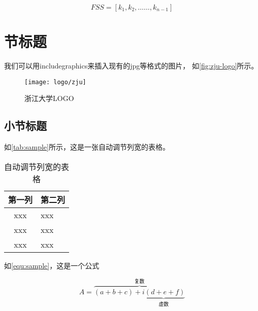 \begin{equation}FSS=\left[k_{1}, k_{2}, \ldots \ldots, k_{n-1}\right]\end{equation}

\section{节标题}

我们可以用includegraphics来插入现有的jpg等格式的图片，
如\autoref{fig:zju-logo}所示。

\begin{figure}[htbp]
    \centering
    \texttt{[image: logo/zju]}
    \caption{\label{fig:zju-logo}浙江大学LOGO}
\end{figure}


\subsection{小节标题}


\par 如\autoref{tab:sample}所示，这是一张自动调节列宽的表格。

\begin{table}[htbp]
    \caption{\label{tab:sample}自动调节列宽的表格}
    \begin{tabularx}{\linewidth}{c|X<{\centering}}
        \hline
        第一列 & 第二列 \\ \hline
        xxx & xxx \\ \hline
        xxx & xxx \\ \hline
        xxx & xxx \\ \hline
    \end{tabularx}
\end{table}


\par 如\autoref{equ:sample}，这是一个公式

\begin{equation}
    \label{equ:sample}
    A=\overbrace{(a+b+c)+\underbrace{i(d+e+f)}_{\text{虚数}}}^{\text{复数}}
\end{equation}

